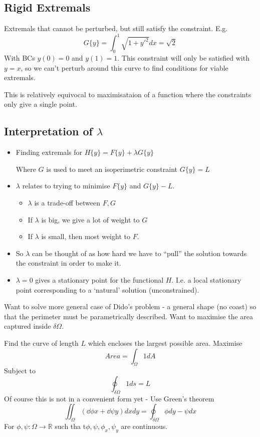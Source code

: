 \documentclass{E:/Documents/Latex/myassignment}
\begin{document}
\subsection{Rigid Extremals}
Extremals that cannot be perturbed, but still satisfy the constraint.
E.g.
\[G\{y\} = \int_0^1 \sqrt{1+y'^2} dx = \sqrt{2}\]
With BCs $y(0) = 0$ and $y(1) = 1$.
This constraint will only be satisfied with $y = x$, so we can't perturb around this curve to find conditions for viable extremals.

This is relatively equivocal to maximisataion of a function where the constraints only give a single point.



\subsection{Interpretation of $\lambda$}
\begin{itemize}
	\item Finding extremals for $H\{y\} = F\{y\} + \lambda G\{y\}$

	Where $G$ is used to meet an isoperimetric constraint $G\{y\} = L$
	\item $\lambda$ relates to trying to minimise $F\{y\}$ and $G\{y\} - L$.
	\begin{itemize}
		\item $\lambda$ is a trade-off between $F,G$
		\item If $\lambda$ is big, we give a lot of weight to $G$
		\item If $\lambda$ is small, then most weight to $F$.
	\end{itemize}
	\item So $\lambda$ can be thought of as how hard we have to ``pull'' the solution towards the constraint in order to make it.
	\item $\lambda = 0$ gives a stationary point for the functional $H$. I.e. a local stationary point corresponding to a `natural' solution (unconstrained).
\end{itemize}

Want to solve more general case of Dido's problem - a general shape (no coast) so that the perimeter must be parametrically described. Want to maximise the area captured inside $\delta\Omega$.

Find the curve of length $L$ which encloses the largest possible area. Maximise
\[Area = \int_{\Omega} 1 dA\]
Subject to
\[\oint_{\delta\Omega} 1 ds = L\]
Of course this is not in a convenient form yet - 
Use Green's theorem
\[\iint_{\Omega} \left(\dd\phi x + \dd\psi y\right) dx dy = \oint_{\delta\Omega} \phi dy - \psi dx\]
For $\phi,\psi : \Omega \to \mathbb{R}$ such tha t$\phi,\psi,\phi_x, \psi_y$ are continuous.
\end{document}
